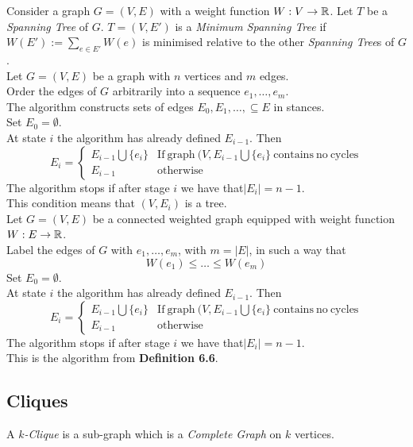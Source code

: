 \documentclass[11pt,a4paper]{article}
\begin{document}
Consider a graph $G=(V,E)$ with a weight function $W:V\to\mathbb{R}$. Let $T$ be a \textit{Spanning Tree} of $G$. $T=(V,E')$ is a \textit{Minimum Spanning Tree} if $W(E'):=\sum_{e\in E'}W(e)$ is minimised relative to the other \textit{Spanning Tree}s of $G$.\\

Let $G=(V,E)$ be a graph with $n$ vertices and $m$ edges.\\
Order the edges of $G$ arbitrarily into a sequence $e_1,\dots,e_m$.\\
The algorithm constructs sets of edges $E_0,E_1,\dots,\subseteq E$ in stances.\\
Set $E_0=\emptyset$.\\
At state $i$ the algorithm has already defined $E_{i-1}$. Then
$$E_i=\begin{cases}E_{i-1}\bigcup\{e_i\}&\mathrm{If\ graph\ }(V,E_{i-1}\bigcup\{e_i\}\ \mathrm{contains\ no\ cycles}\\E_{i-1}&\mathrm{otherwise}\end{cases}$$
The algorithm stops if after stage $i$ we have that$|E_i|=n-1$.\\
This condition means that $(V,E_i)$ is a tree.\\

Let $G=(V,E)$ be a connected weighted graph equipped with weight function $W:E\to\mathbb{R}$.\\
Label the edges of $G$ with $e_1,\dots,e_m$, with $m=|E|$, in such a way that
$$W(e_1)\leq\dots\leq W(e_m)$$
Set $E_0=\emptyset$.\\
At state $i$ the algorithm has already defined $E_{i-1}$. Then
$$E_i=\begin{cases}E_{i-1}\bigcup\{e_i\}&\mathrm{If\ graph\ }(V,E_{i-1}\bigcup\{e_i\}\ \mathrm{contains\ no\ cycles}\\E_{i-1}&\mathrm{otherwise}\end{cases}$$
The algorithm stops if after stage $i$ we have that$|E_i|=n-1$.\\
\NB This is the algorithm from \textbf{Definition 6.6}.\\

\subsection{Cliques}

A \textit{$k$-Clique} is a sub-graph which is a \textit{Complete Graph} on $k$ vertices.\\
\end{document}
